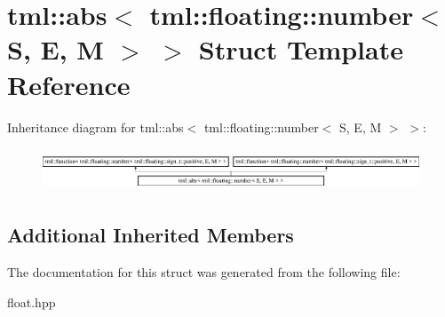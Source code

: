 \hypertarget{structtml_1_1abs_3_01tml_1_1floating_1_1number_3_01S_00_01E_00_01M_01_4_01_4}{\section{tml\+:\+:abs$<$ tml\+:\+:floating\+:\+:number$<$ S, E, M $>$ $>$ Struct Template Reference}
\label{structtml_1_1abs_3_01tml_1_1floating_1_1number_3_01S_00_01E_00_01M_01_4_01_4}
}
Inheritance diagram for tml\+:\+:abs$<$ tml\+:\+:floating\+:\+:number$<$ S, E, M $>$ $>$\+:\begin{figure}[H]
\begin{center}
\leavevmode
\includegraphics[height=1.299304cm]{structtml_1_1abs_3_01tml_1_1floating_1_1number_3_01S_00_01E_00_01M_01_4_01_4}
\end{center}
\end{figure}
\subsection*{Additional Inherited Members}


The documentation for this struct was generated from the following file\+:\begin{DoxyCompactItemize}
\item 
float.\+hpp\end{DoxyCompactItemize}
